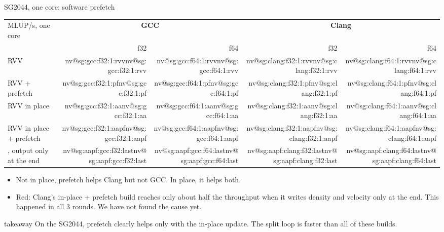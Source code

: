 \documentclass[aspectratio=169,10pt,t]{beamer}
\makeatletter
\newcommand{\nv}[1]{\ifcsname nv@#1\endcsname\csname nv@#1\endcsname\else
  \errmessage{presentation7: unknown number '#1' (see tables/numbers.tex)}\fi}
\newcommand{\takeaway}[1]{\par\vfill
  \begin{beamercolorbox}[wd=\textwidth,sep=4pt,rounded=true]{takeaway}
    \small #1
  \end{beamercolorbox}}
\newcommand{\sid}[1]{\hyperlink{ids-sg}{\usebox{\csname sid@box@#1\endcsname}}}
\makeatother
\begin{document}
\begin{frame}{SG2044, one core: software prefetch}
  \vspace{1mm}
  \centering
  {\footnotesize\renewcommand{\arraystretch}{1.12}
  \begin{tabular}{@{}lrrrr@{}}
    \toprule
    MLUP/s, one core & \multicolumn{2}{c}{\textbf{GCC}} & \multicolumn{2}{c}{\textbf{Clang}}\\
    \cmidrule(lr){2-3}\cmidrule(l){4-5}
    & f32 & f64 & f32 & f64\\
    \midrule
    \sid{7} RVV & \nv{sg:gcc:f32:1:rvv} & \nv{sg:gcc:f64:1:rvv} & \nv{sg:clang:f32:1:rvv} & \nv{sg:clang:f64:1:rvv}\\
    \sid{8} RVV + prefetch & \nv{sg:gcc:f32:1:pf} & \nv{sg:gcc:f64:1:pf} & \nv{sg:clang:f32:1:pf} & \nv{sg:clang:f64:1:pf}\\
    \midrule
    \sid{9} RVV in place & \nv{sg:gcc:f32:1:aa} & \nv{sg:gcc:f64:1:aa} & \nv{sg:clang:f32:1:aa} & \nv{sg:clang:f64:1:aa}\\
    \sid{10} RVV in place + prefetch & \nv{sg:gcc:f32:1:aapf} & \nv{sg:gcc:f64:1:aapf} & \nv{sg:clang:f32:1:aapf} & \nv{sg:clang:f64:1:aapf}\\
    \hspace{1em}\sid{10}, output only at the end & \nv{sg:aapf:gcc:f32:last} & \nv{sg:aapf:gcc:f64:last}
      & \textcolor{psred}{\nv{sg:aapf:clang:f32:last}} & \textcolor{psred}{\nv{sg:aapf:clang:f64:last}}\\
    \bottomrule
  \end{tabular}\par}
  \vspace{2mm}
  \raggedright
  \begin{itemize}\small
    \item Not in place, prefetch helps Clang but not GCC. In place, it helps both.
    \item \textcolor{psred}{Red}: Clang's in-place + prefetch build reaches only about half the throughput when it writes density
          and velocity only at the end. This happened in all 3 rounds. We have not found the cause yet.
  \end{itemize}
  \takeaway{On the SG2044, prefetch clearly helps only with the in-place update. The split loop is faster than all
    of these builds.}
\end{frame}
\end{document}

